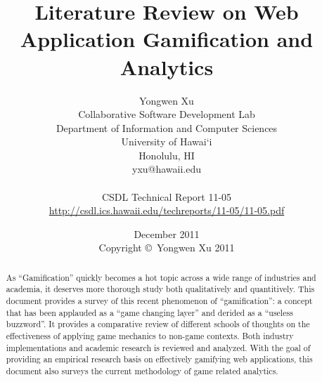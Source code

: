 \documentclass[11pt]{report}
\begin{document}
\title{Literature Review on Web Application Gamification and Analytics}
\author{Yongwen Xu \\
Collaborative Software Development Lab \\
Department of Information and Computer Sciences \\
University of Hawai`i \\
Honolulu, HI \\
yxu@hawaii.edu \\
\\
CSDL Technical Report 11-05 \\
\url{http://csdl.ics.hawaii.edu/techreports/11-05/11-05.pdf}
}
\date{December 2011\\[3pt]
Copyright \copyright\ Yongwen Xu 2011}

\maketitle

\tableofcontents

\begin{abstract}
As ``Gamification'' quickly becomes a hot topic across a wide range of industries and academia, it deserves more thorough study both qualitatively and quantitively. This document provides a survey of this recent phenomenon of ``gamification'': a concept that has been applauded as a ``game changing layer'' and derided as a ``useless buzzword''. It provides a comparative review of different schools of thoughts on the effectiveness of applying game mechanics to non-game contexts. Both industry implementations and academic research is reviewed and analyzed. With the goal of providing an empirical research basis on effectively gamifying web applications, this document also surveys the current methodology of game related analytics.
\end{abstract}












%
%
%


\end{document}
